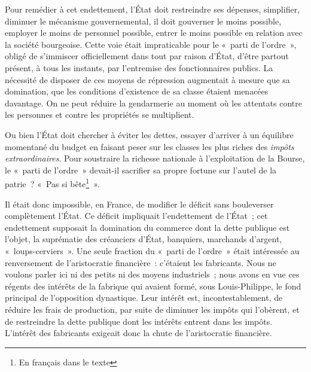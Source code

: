 \documentclass[twoside]{book} %
\begin{document}
Pour remédier à cet endettement, l’État doit restreindre ses dépenses, simplifier, diminuer le mécanisme gouvernemental, il doit gouverner le moins possible, employer le moins de personnel possible, entrer le moins possible en relation avec la société bourgeoise. Cette voie était impraticable pour le « parti de l’ordre », obligé de s’immiscer officiellement dans tout par raison d’État, d’être partout présent, à tous les instants, par l’entremise des fonctionnaires publics. La nécessité de disposer de ces moyens de répression augmentait à mesure que sa domination, que les conditions d’existence de sa classe étaient menacées davantage. On ne peut réduire la gendarmerie au moment où les attentats contre les personnes et contre les propriétés se multiplient.\par
Ou bien l’État doit chercher à éviter les dettes, essayer d’arriver à un équilibre momentané du budget en faisant peser sur les classes les plus riches des \emph{impôts extraordinaires}. Pour soustraire la richesse nationale à l’exploitation de la Bourse, le « parti de l’ordre » devait-il sacrifier sa propre fortune sur l’autel de la patrie ? « Pas si bête\footnote{En français dans le texte} ».\par
Il était donc impossible, en France, de modifier le déficit sans bouleverser complètement l’État. Ce déficit impliquait l’endettement de l’État ; cet endettement supposait la domination du commerce dont la dette publique est l’objet, la suprématie des créanciers d’État, banquiers, marchands d’argent, « loups-cerviers ». Une seule fraction du « parti de l’ordre » était intéressée au renversement de l’aristocratie financière : c’étaient les fabricants. Nous ne voulons parler ici ni des petits ni des moyens industriels ; nous avons en vue ces régents des intérêts de la fabrique qui avaient formé, sous Louis-Philippe, le fond principal de l’opposition dynastique. Leur intérêt est, incontestablement, de réduire les frais de production, par suite de diminuer les impôts qui l’obèrent, et de restreindre la dette publique dont les intérêts entrent dans les impôts. L’intérêt des fabricants exigeait donc la chute de l’aristocratie financière.\par
\end{document}
